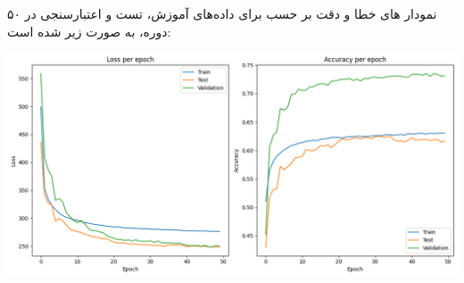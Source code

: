 \begin{qsolve}
	نمودار های خطا و دقت بر حسب  برای داده‌های آموزش، تست و اعتبارسنجی در ۵۰ دوره، به صورت زیر شده است:
	\begin{center}
		\includegraphics*[width=0.9\linewidth]{pics/img16.png}
		\label{نمودار خطا و دقت}
	\end{center}
	
\end{qsolve}